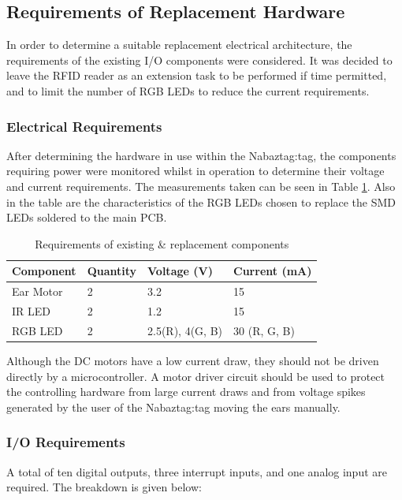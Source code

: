 \documentclass[12pt, a4paper]{article}
\begin{document}
		\subsection{Requirements of Replacement Hardware}
		
		In order to determine a suitable replacement electrical architecture, the requirements of the existing \ac{I/O} components were considered. It was decided to leave the \ac{RFID} reader as an extension task to be performed if time permitted, and to limit the number of \ac{RGB} \acp{LED} to reduce the current requirements.
		
		\subsubsection{Electrical Requirements}
			After determining the hardware in use within the Nabaztag:tag, the components requiring power were monitored whilst in operation to determine their voltage and current requirements. The measurements taken can be seen in Table \ref{measurements}. Also in the table are the characteristics of the \ac{RGB} \ac{LED}s \parencite{rgbledsdatasheet} chosen to replace the \ac{SMD} \acp{LED} soldered to the main \ac{PCB}.
			
			\begin{table}[H]
				\centering
				\begin{tabular}{| l | l | l | l |}
					\hline
					Component & Quantity & Voltage (V) & Current (mA)\\
					\hline
					Ear Motor & 2 & 3.2 & 15\\
					\hline
					\ac{IR} \ac{LED} & 2 & 1.2 & 15\\
					\hline
					\ac{RGB} \ac{LED} & 2 & 2.5(R), 4(G, B) & 30 (R, G, B)\\
					\hline
				\end{tabular}
				\caption{Requirements of existing \& replacement components}
				\label{measurements}
			\end{table}
			
			Although the \ac{DC} motors have a low current draw, they should not be driven directly by a microcontroller. A motor driver circuit should be used to protect the controlling hardware from large current draws and from voltage spikes generated by the user of the Nabaztag:tag moving the ears manually.

			
		\subsubsection{\acl{I/O} Requirements}
			A total of ten digital outputs, three interrupt inputs, and one analog input are required. The breakdown is given below:
			
\end{document}
